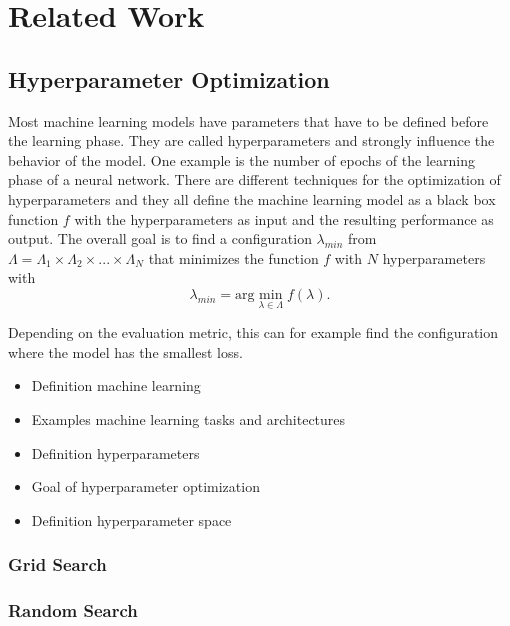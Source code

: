 
\chapter{Related Work}\label{chapter:theoretical_background}

\section{Hyperparameter Optimization}

Most machine learning models have parameters that have to be defined before the learning phase. They are called hyperparameters and strongly influence the behavior of the model. One example is the number of epochs of the learning phase of a neural network. There are different techniques for the optimization of hyperparameters and they all define the machine learning model as a black box function $ f $ with the hyperparameters as input and the resulting performance as output. The overall goal is to find a configuration $ \lambda_{min} $ from $ \Lambda = \Lambda_1 \times \Lambda_2 \times ... \times \Lambda_N $ that minimizes the function $ f $ with $ N $ hyperparameters with 
\begin{equation}
	\lambda_{min} = \text{arg} \min_{\lambda \in \Lambda} f(\lambda) .
\end{equation}

Depending on the evaluation metric, this can for example find the configuration where the model has the smallest loss. 
\cite{feurer2019hyperparameter,bischl2021hyperparameter}

\begin{itemize}
	\item Definition machine learning 
	\item Examples machine learning tasks and architectures
	\item Definition hyperparameters
	\item Goal of hyperparameter optimization
	\item Definition hyperparameter space 
\end{itemize}

\subsection{Grid Search}

\subsection{Random Search}

